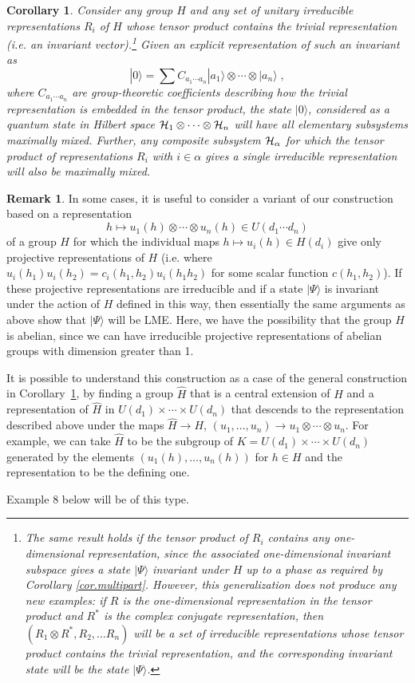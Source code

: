 \documentclass[12pt]{article}
\newtheorem{corollary}[theorem]{Corollary}
\theoremstyle{definition}
\newtheorem{remark}[theorem]{Remark}
\newcommand{\be}{\begin{equation}}
\newcommand{\ee}{\end{equation}}
\begin{document}
\begin{corollary} \label{cor.genstates}
Consider any group $H$ and any set of unitary irreducible representations $R_i$ of $H$ whose tensor product contains the trivial representation (i.e. an invariant vector).\footnote{The same result holds if the tensor product of $R_i$ contains any one-dimensional representation, since the associated one-dimensional invariant subspace gives a state $|\Psi \rangle$ invariant under $H$ up to a phase as required by Corollary \ref{cor.multipart}. However, this generalization does not produce any new examples: if $R$ is the one-dimensional representation in the tensor product and $R^*$ is the complex conjugate representation, then $(R_1 \otimes R^*,R_2, \dots R_n)$ will be a set of irreducible representations whose tensor product contains the trivial representation, and the corresponding invariant state will be the state $|\Psi \rangle$.} Given an explicit representation of such an invariant as
\be
\label{genstates}
|0 \rangle = \sum C_{a_1 \cdots a_n} |a_1 \rangle \otimes \cdots \otimes | a_n \rangle \; ,
\ee
where $C_{a_1 \cdots a_n}$ are group-theoretic coefficients describing how the trivial representation is embedded in the tensor product, the state $|0 \rangle$, considered as a quantum state in Hilbert space ${\cal H}_1 \otimes \cdots \otimes {\cal H}_n $ will have all elementary subsystems maximally mixed. Further, any composite subsystem ${\cal H}_{\alpha}$ for which the tensor product of representations $R_i$ with $i \in \alpha$ gives a single irreducible representation will also be maximally mixed.
\end{corollary}

\begin{remark}
In some cases, it is useful to consider a variant of our construction based on a representation
\be
h \longmapsto u_1(h)  \otimes \cdots  \otimes u_n(h) \in U(d_1\cdots d_n)
\ee
of a group $H$ for which the individual maps $h \mapsto u_i(h)\in H(d_i)$ give only projective representations of $H$ (i.e. where $u_i(h_1) u_i(h_2) = c_i(h_1,h_2)u_i(h_1 h_2)$ for some scalar function $c(h_1,h_2)$). If these projective representations are irreducible and if a state $|\Psi\rangle$ is invariant under the action of $H$ defined in this way, then essentially the same arguments as above show that $|\Psi\rangle$ will be LME. Here, we have the possibility that the group $H$ is abelian, since we can have irreducible projective representations of abelian groups with dimension greater than 1. 

It is possible to understand this construction as a case of the general construction in Corollary~\ref{cor.genstates}, by finding a group $\hat{H}$ that is a central extension of $H$ and a representation of $\hat{H}$ in $U(d_1) \times \cdots \times U(d_n)$ that descends to the representation described above under the maps $\hat{H} \to H$, $(u_1,\dots, u_n) \to u_1 \otimes \cdots \otimes u_n$. For example, we can take $\hat{H}$ to be the subgroup of $K = U(d_1) \times \cdots \times U(d_n)$ generated by the elements $(u_1(h),\dots, u_n(h))$ for $h \in H$ and the representation to be the defining one.

Example 8 below will be of this type.  
\end{remark}
\end{document}
